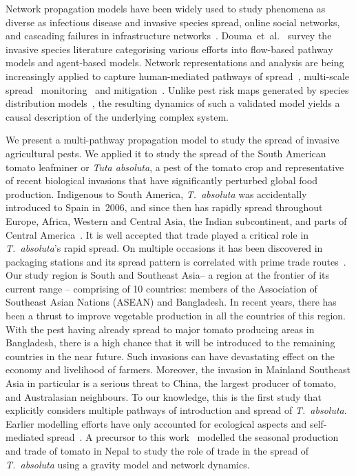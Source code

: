 \documentclass[11pt]{article}
\newcommand{\tuta}{\emph{T.~absoluta}}
\theoremstyle{definition}
\begin{document}
Network propagation models have been widely used to study phenomena as
diverse as infectious disease and invasive species spread, online social
networks, and cascading failures in infrastructure
networks~\cite{barrat2008dynamical}. Douma~et~al.~\cite{douma2016pathway}
survey the invasive species literature categorising various efforts into
flow-based pathway models and agent-based models. Network representations
and analysis are being increasingly applied to capture human-mediated
pathways of spread~\cite{nopsa2015ecological,carrasco2010unveiling},
multi-scale spread~\cite{wildemeersch2019modelling}
monitoring~\cite{martinetti2019identifying} and
mitigation~\cite{strona2017network}. Unlike pest risk maps generated by
species distribution models~\cite{pearson2007species}, the resulting
dynamics of such a validated model yields a causal description of the
underlying complex system.

We present a multi-pathway propagation model to study the spread of
invasive agricultural pests. We applied it to study the spread of the South
American tomato leafminer or \emph{Tuta absoluta}, a pest of the tomato
crop and representative of recent biological invasions that have
significantly perturbed global food production. Indigenous to South
America, \tuta{} was accidentally introduced to Spain in~2006, and since
then has rapidly spread throughout Europe, Africa, Western and Central
Asia, the Indian subcontinent, and parts of Central
America~\cite{desneux2010biological,biondi2018ecology}. It is well accepted that
trade played a critical role in \tuta{}'s rapid spread. On multiple
occasions it has been discovered in packaging stations and its spread
pattern is correlated with prime trade routes~\cite{karadjova2013tuta}. Our
study region is South and Southeast Asia-- a region at the frontier of its
current range -- comprising of 10 countries: members of the Association of
Southeast Asian Nations (ASEAN) and Bangladesh. In recent years, there has
been a thrust to improve vegetable production in all the countries of this
region. With the pest having already spread to major tomato producing areas
in Bangladesh, there is a high chance that it will be introduced to the
remaining countries in the near future. Such invasions can have devastating
effect on the economy and livelihood of farmers. Moreover, the invasion in
Mainland Southeast Asia in particular is a serious threat to China, the
largest producer of tomato, and Australasian neighbours. To our knowledge,
this is the first study that explicitly considers multiple pathways of
introduction and spread of \tuta{}. Earlier modelling efforts have only
accounted for ecological aspects and self-mediated
spread~\cite{desneux2010biological,tonnang2015identification,guimapi2016modeling}.
A precursor to this work~\cite{venkatramanan2019modeling} modelled the
seasonal production and trade of tomato in Nepal to study the role of trade
in the spread of \tuta{} using a gravity model and network dynamics.
\end{document}
